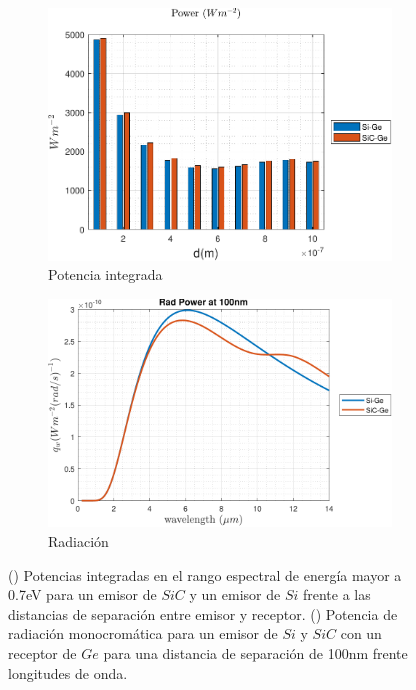 \begin{figure}[H]
	\centering
	\begin{subfigure}[b]{0.49\textwidth}
		\centering
		\includegraphics[width=1.00\textwidth]{SiCvsSi.pdf}
		\caption{Potencia integrada}
		\label{fig:Prad_SiCGe}
	\end{subfigure}
	\hfill
	\begin{subfigure}[b]{0.49\textwidth}
		\centering
		\includegraphics[width=1.00\textwidth]{SiCvsSi_rad.pdf}
		\caption{Radiación}
		\label{fig:rad_SiCGe}
	\end{subfigure}
	\caption{() Potencias integradas en el rango espectral de energía mayor a 0.7eV para un emisor de $SiC$ y un emisor de $Si$ frente a las distancias de separación entre emisor y receptor. () Potencia de radiación monocromática para un emisor de $Si$ y $SiC$ con un receptor de $Ge$ para una distancia de separación de 100nm frente longitudes de onda.}
	\label{fig:rads_SiCGe}
\end{figure}
